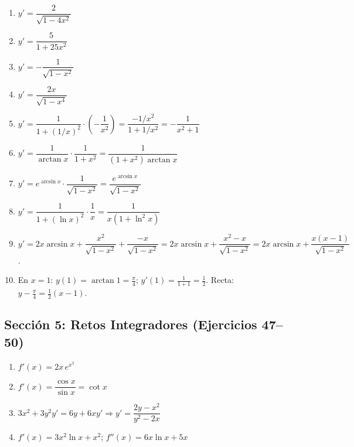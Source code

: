 \documentclass[12pt, letterpaper]{article}
\begin{document}
\begin{enumerate}[resume=respuestas, leftmargin=*, label=\textbf{\arabic*.}]
  \item $y' = \dfrac{2}{\sqrt{1 - 4x^2}}$
  \item $y' = \dfrac{5}{1 + 25x^2}$
  \item $y' = -\dfrac{1}{\sqrt{1 - x^2}}$
  \item $y' = \dfrac{2x}{\sqrt{1 - x^4}}$
  \item $y' = \dfrac{1}{1 + (1/x)^2} \cdot \left(-\dfrac{1}{x^2}\right) = \dfrac{-1/x^2}{1 + 1/x^2} = -\dfrac{1}{x^2 + 1}$
  \item $y' = \dfrac{1}{\arctan x} \cdot \dfrac{1}{1 + x^2} = \dfrac{1}{(1 + x^2)\arctan x}$
  \item $y' = e^{\arcsin x} \cdot \dfrac{1}{\sqrt{1 - x^2}} = \dfrac{e^{\arcsin x}}{\sqrt{1 - x^2}}$
  \item $y' = \dfrac{1}{1 + (\ln x)^2} \cdot \dfrac{1}{x} = \dfrac{1}{x(1 + \ln^2 x)}$
  \item $y' = 2x\arcsin x + \dfrac{x^2}{\sqrt{1 - x^2}} + \dfrac{-x}{\sqrt{1-x^2}} = 2x\arcsin x + \dfrac{x^2 - x}{\sqrt{1 - x^2}} = 2x \arcsin x + \dfrac{x(x-1)}{\sqrt{1-x^2}}$.
  \item En $x = 1$: $y(1) = \arctan 1 = \frac{\pi}{4}$; $y'(1) = \frac{1}{1+1} = \frac{1}{2}$. Recta: $y - \frac{\pi}{4} = \frac{1}{2}(x - 1)$.
\end{enumerate}


\subsection*{Sección 5: Retos Integradores (Ejercicios 47--50)}
\begin{enumerate}[resume=respuestas, leftmargin=*, label=\textbf{\arabic*.}]
  \item $f'(x) = 2x\,e^{x^2}$
  \item $f'(x) = \dfrac{\cos x}{\sin x} = \cot x$
  \item $3x^2 + 3y^2 y' = 6y + 6x y' \Rightarrow y' = \dfrac{2y - x^2}{y^2 - 2x}$
  \item $f'(x) = 3x^2 \ln x + x^2$; \quad $f''(x) = 6x \ln x + 5x$
\end{enumerate}
\fi
\end{document}
